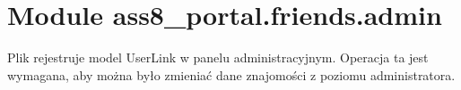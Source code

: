 %
%
%


\section{Module ass8\_portal.friends.admin}

    \label{ass8_portal:friends:admin}
Plik rejestruje model UserLink w panelu administracyjnym. Operacja ta jest 
wymagana, aby można było zmieniać dane znajomości z poziomu administratora.


